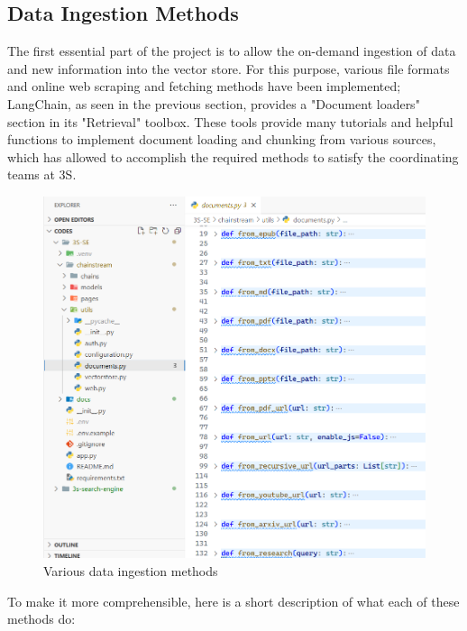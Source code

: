 \subsection{Data Ingestion Methods}
The first essential part of the project is to allow the on-demand ingestion of data and new information into the vector store.\newline
For this purpose, various file formats and online web scraping and fetching methods have been implemented; LangChain, as seen in the previous section, provides a "Document loaders" section in its "Retrieval" toolbox. These tools provide many tutorials and helpful functions to implement document loading and chunking from various sources, which has allowed to accomplish the required methods to satisfy the coordinating teams at 3S.
\begin{figure}[htbp]
    \centering
    \includegraphics[width=\linewidth]{./figures/data-ingestion-methods.png}
    \caption{Various data ingestion methods}
\end{figure}\newline
To make it more comprehensible, here is a short description of what each of these methods do:

